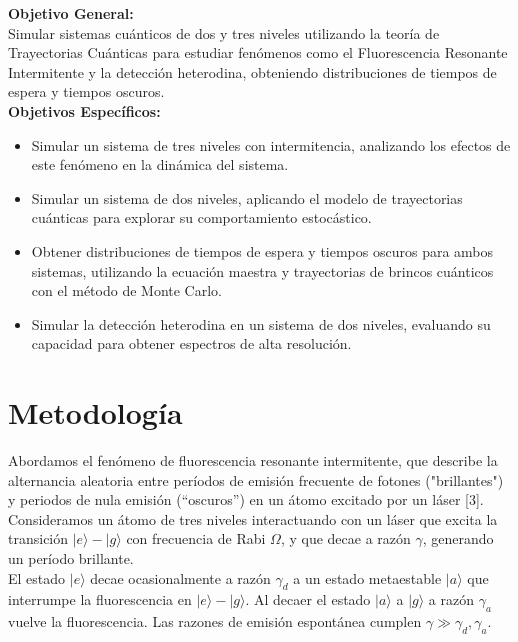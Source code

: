 \documentclass[12pt]{report}
\begin{document}
\textbf{Objetivo General:} \\
Simular sistemas cuánticos de dos y tres niveles utilizando la teoría de Trayectorias Cuánticas para estudiar fenómenos como el Fluorescencia Resonante Intermitente y la detección heterodina, obteniendo distribuciones de tiempos de espera y tiempos oscuros.\\

\textbf{Objetivos Específicos:}
\begin{itemize}
    \item Simular un sistema de tres niveles con intermitencia, analizando los efectos de este fenómeno en la dinámica del sistema.
    \item Simular un sistema de dos niveles, aplicando el modelo de trayectorias cuánticas para explorar su comportamiento estocástico.
    \item Obtener distribuciones de tiempos de espera y tiempos oscuros para ambos sistemas, utilizando la ecuación maestra y trayectorias de brincos cuánticos con el método de Monte Carlo.
    \item Simular la detección heterodina en un sistema de dos niveles, evaluando su capacidad para obtener espectros de alta resolución.
\end{itemize}



\section*{Metodología}

Abordamos el fenómeno de fluorescencia resonante intermitente, que describe la alternancia aleatoria entre per\'iodos de emisión frecuente de fotones ("brillantes") y periodos de nula emisión (``oscuros'') en un átomo excitado por un láser [3]. \\

Consideramos un átomo de tres niveles interactuando con un láser que excita la transici\'on 
$|e \rangle - |g \rangle$ con frecuencia de Rabi $\Omega$, y que decae a raz\'on $\gamma$, generando un per\'iodo brillante. 
\\
El estado $|e \rangle$ decae ocasionalmente a raz\'on $\gamma_d$ a un estado metaestable $|a \rangle$ que interrumpe la fluorescencia en $|e \rangle - |g \rangle$. Al decaer el estado $|a \rangle$ a $|g \rangle$ a raz\'on $\gamma_a$ vuelve la fluorescencia. Las razones de emisi\'on espont\'anea cumplen 
$\gamma \gg \gamma_d,\gamma_a$.
\\
\end{document}
